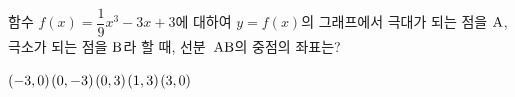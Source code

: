 함수 $f(x)=\dfrac{1}{9}x^3-3x+3$에 대하여 $y=f(x)$의 그래프에서 극대가 되는 점을 $\mathrm{A}$, 극소가 되는 점을 $\mathrm{B}$라 할 때, 선분~$\mathrm{AB}$의 중점의 좌표는?
\begin{choices32}{$(-3{,}\mkern3mu\mathopen{}0)$}{$(0{,}\mkern3mu\mathopen{}-3)$}{$(0{,}\mkern3mu\mathopen{}3)$}{$(1{,}\mkern3mu\mathopen{}3)$}{$(3{,}\mkern3mu\mathopen{}0)$}\end{choices32}
